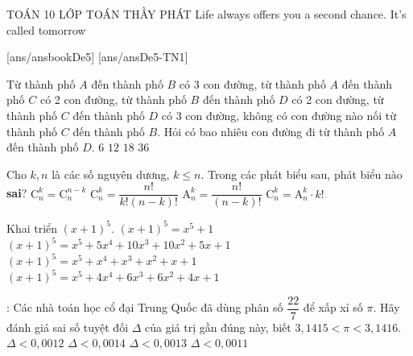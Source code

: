 \begin{name}
	{\tenchude}
	{TOÁN 10}
	{LỚP TOÁN THẦY PHÁT}
	{Life always offers you a second chance. It’s called tomorrow}
\end{name}
[ans/ansbookDe5]
\TN
{}[ans/ansDe5-TN1]
\begin{ex}%
Từ thành phố $A$ đến thành phố $B$ có 3 con đường, từ thành phố $A$ đến thành phố $C$ có 2 con đường, từ thành phố $B$ đến thành phố $D$ có 2 con đường, từ thành phố $C$ đến thành phố $D$ có 3 con đường, không có con đường nào nối từ thành phố $C$ đến thành phố $B$. Hỏi có bao nhiêu con đường đi từ thành phố $A$ đến thành phố $D$.
\choice
{$6$}
{\True $12$}
{$18$}
{$36$}
\end{ex}

\begin{ex}%
Cho $k,n$ là các số nguyên dương, $k \leq n$. Trong các phát biểu sau, phát biểu nào \textbf{sai}?
\choice
{$\mathrm{C}_n^k=\mathrm{C}_n^{n-k}$}
{$\mathrm{C}_n^k=\dfrac{n!}{k!(n-k)!}$}
{$\mathrm{A}_n^k=\dfrac{n!}{(n-k)!}$}
{\True $\mathrm{C}_n^k=\mathrm{A}_n^k \cdot k!$}
\end{ex}

\begin{ex}%
Khai triển $(x+1)^5$.
\choice
{$(x+1)^5=x^5+1$}
{\True $(x+1)^5=x^5+5x^4+10x^3+10x^2+5x+1$}
{$(x+1)^5=x^5+x^4+x^3+x^2+x+1$}
{$(x+1)^5=x^5+4x^4+6x^3+6x^2+4x+1$}
\end{ex}

\begin{ex}  :%
Các nhà toán học cổ đại Trung Quốc đã dùng phân số $\dfrac{22}{7}$ để xấp xỉ số $\pi $. Hãy đánh giá sai số tuyệt đối $\Delta $ của giá trị gần đúng này, biết $3{,}1415<\pi <3{,}1416$.
\choice
{$\Delta <0{,}0012$}
{$\Delta <0{,}0014$}
{\True $\Delta <0{,}0013$}
{$\Delta <0{,}0011$}
\end{ex}

